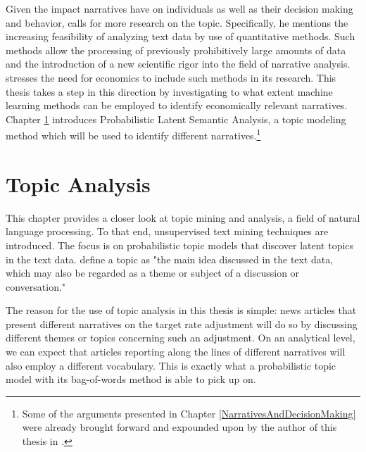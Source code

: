 \documentclass[11pt,a4paper,english,oneside]{book}
\numberwithin{equation}{chapter}
\begin{document}
Given the impact narratives have on individuals as well as their decision making and behavior, \citet[pp. 997--999]{Shiller.2017} calls for more research on the topic. Specifically, he mentions the increasing feasibility of analyzing text data by use of quantitative methods. Such methods allow the processing of previously prohibitively large amounts of data and the introduction of a new scientific rigor into the field of narrative analysis. \citet[pp. 997--999]{Shiller.2017} stresses the need for economics to include such methods in its research. 
This thesis takes a step in this direction by investigating to what extent machine learning methods can be employed to identify economically relevant narratives.
Chapter \ref{NLP} introduces Probabilistic Latent Semantic Analysis, a topic modeling method which will be used to identify different narratives.\footnote{Some of the arguments presented in Chapter \ref{NarrativesAndDecisionMaking} were already brought forward and expounded upon by the author of this thesis in \cite{Knoe.2017}.}


\chapter{Topic Analysis}\label{NLP}
This chapter provides a closer look at topic mining and analysis, a field of natural language processing. To that end, unsupervised text mining techniques are introduced. The focus is on probabilistic topic models that discover latent topics in the text data. \citet[p.~329]{Zhai.2016} define a topic as "the main idea discussed in the text data, which may also be regarded as a theme or subject of a discussion or conversation."

The reason for the use of topic analysis in this thesis is simple: news articles that present different narratives on the target rate adjustment will do so by discussing different themes or topics concerning such an adjustment. On an analytical level, we can expect that articles reporting along the lines of different narratives will also employ a different vocabulary. This is exactly what a probabilistic topic model with its bag-of-words method is able to pick up on. 
\end{document}
